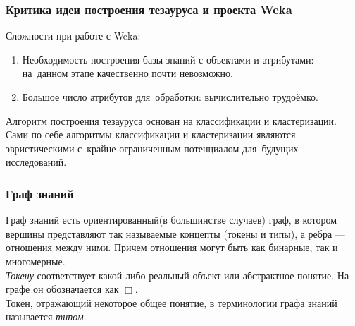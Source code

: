 \documentclass{beamer}
\begin{document}
\begin{frame}
\frametitle{Критика идеи построения тезауруса и проекта Weka}

Сложности при работе с Weka:
\begin{enumerate}
\item{Необходимость построения базы знаний  с объектами и атрибутами: на~данном этапе качественно почти невозможно.}
\item{Большое число атрибутов для~обработки: вычислительно трудоёмко.}
\end{enumerate}

Алгоритм построения тезауруса основан на классификации и кластеризации.
Сами по себе алгоритмы классификации и кластеризации являются эвристическими с~крайне ограниченным потенциалом для~будущих исследований.

\end{frame}

\begin{frame}
\frametitle{Граф знаний}
Граф знаний есть ориентированный(в большинстве случаев) граф, в котором вершины представляют так называемые концепты (токены и типы),
а ребра --- отношения между ними.
Причем отношения могут быть как бинарные, так и многомерные.\\ 

\textsl{Токену} соответствует какой-либо реальный объект или абстрактное понятие.
 На графе он обозначается как $\Box$. \\

Токен, отражающий некоторое общее понятие, в терминологии графа знаний называется \textsl{типом}.\\
\end{frame}
\end{document}
